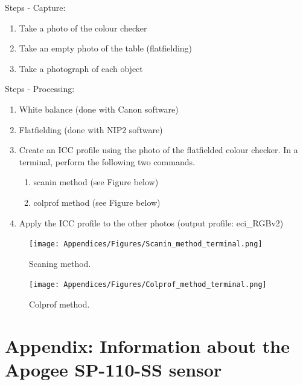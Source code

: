 \begin{appendices}
Steps - Capture:
\begin{enumerate}
\item Take a photo of the colour checker
\item Take an empty photo of the table (flatfielding)
\item Take a photograph of each object
\end{enumerate}

\vspace{1cm}

Steps - Processing:
\begin{enumerate}
\item White balance (done with Canon software)
\item Flatfielding (done with NIP2 software)
\item Create an ICC profile using the photo of the flatfielded colour checker. In a terminal, perform the following two commands.
\begin{enumerate}
\item scanin method (see Figure below)
\item colprof method (see Figure below)
\end{enumerate}
\item Apply the ICC profile to the other photos (output profile: eci\_RGBv2)
\end{enumerate}

\begin{figure}[!h]
\centering
\texttt{[image: Appendices/Figures/Scanin\_method\_terminal.png]}
\caption*{Scaning method.}
\end{figure}


\begin{figure}[!h]
\centering
\texttt{[image: Appendices/Figures/Colprof\_method\_terminal.png]}
\caption*{Colprof method.}
\end{figure}


\newpage
\section[\hspace{0.3cm}Information about the Apogee SP-110-SS sensor]{ Appendix: Information about the Apogee SP-110-SS sensor}
\label{app:ch4_apogee_SP-110-SS}


\end{appendices}
